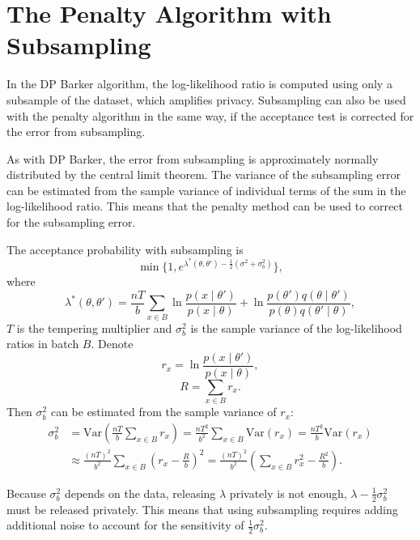 \documentclass[english,twoside,openright]{HYgraduMLDS}
\newcommand{\var}{\mathrm{Var}}
\begin{document}
\section{The Penalty Algorithm with Subsampling}\label{dp_minibatch_penalty_section}

In the DP Barker algorithm, the log-likelihood ratio is computed using only
a subsample of the dataset, which amplifies privacy. Subsampling can also be used
with the penalty algorithm in the same way, if the acceptance test is 
corrected for the error from subsampling.

As with DP Barker, the error from subsampling is approximately normally 
distributed by the central limit theorem. The variance of the subsampling 
error can be estimated from the sample variance of individual terms of the 
sum in the log-likelihood ratio. This means that the penalty method can be used
to correct for the subsampling error.

The acceptance probability with subsampling is
\[
    \min\{1, e^{\lambda^*(\theta, \theta') - \frac{1}{2}(\sigma^2 + \sigma_b^2)}\},
\]
where
\[
    \lambda^*(\theta, \theta') = \frac{nT}{b}\sum_{x\in B}
    \ln \frac{p(x\mid \theta')}{p(x \mid \theta)}
    + \ln \frac{p(\theta')q(\theta \mid \theta')}{p(\theta)q(\theta' \mid \theta)},
\]
\(T\) is the tempering multiplier
and \(\sigma_b^2\) is the sample variance of the log-likelihood ratios in
batch \(B\). Denote
\[
    r_x = \ln \frac{p(x\mid \theta')}{p(x\mid \theta)},
\]
\[
    R = \sum_{x\in B}r_x.
\]
Then \(\sigma^2_b\) can be estimated from the sample variance of \(r_x\):
\begin{align*}
    \sigma_b^2 
    &= \var\left(\frac{nT}{b}\sum_{x\in B}r_x\right)
    = \frac{nT^2}{b^2}\sum_{x\in B}\var(r_x)
    = \frac{nT^2}{b}\var(r_x)
  \\&\approx\frac{(nT)^2}{b^2}
    \sum_{x\in B}\left(r_x - \frac{R}{b}\right)^2
    = \frac{(nT)^2}{b^2}\left(\sum_{x\in B}r_x^2 - \frac{R^2}{b}\right).
\end{align*}

Because \(\sigma_b^2\) depends on the data, releasing \(\lambda\) privately is 
not enough, \(\lambda - \frac{1}{2}\sigma_b^2\) must be released privately.
This means that using subsampling requires adding additional noise to account 
for the sensitivity of \(\frac{1}{2}\sigma_b^2\).
\end{document}
